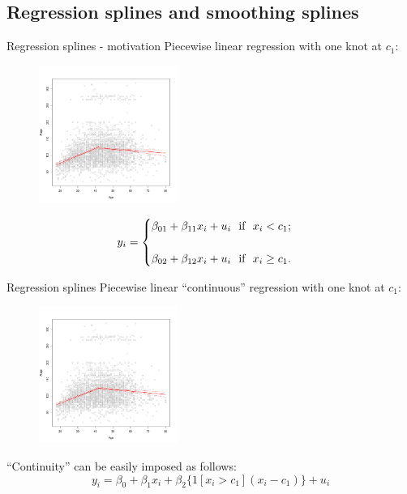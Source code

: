 \documentclass{beamer}
\begin{document}
\subsection{Regression splines and smoothing splines}
\begin{frame}{Regression splines - motivation}
\centering
Piecewise linear regression with one knot at $c_1$:\\
\vspace{-0.2cm}
\begin{figure}
  \centering
  \includegraphics[trim=0cm 0cm 0cm 0cm, clip=true, width=0.4\textwidth]{IMG/ISLR73a.pdf}
\end{figure}
\vspace{-0.2cm}
\begin{equation*}
y_i = 
    \begin{cases}
        \beta_{01} + \beta_{11} x_i + u_i \textnormal{~~if~~} x_i <  c_1 ;& \\ ~ & \\
         \beta_{02} + \beta_{12} x_i + u_i \textnormal{~~if~~} x_i \geq  c_1 .& 
    \end{cases}
\end{equation*}
\end{frame}
\begin{frame}{Regression splines}
\centering
Piecewise linear ``continuous'' regression with one knot at $c_1$:\\
\vspace{-0.2cm}
\begin{figure}
  \centering
  \includegraphics[trim=0cm 0cm 0cm 0cm, clip=true, width=0.4\textwidth]{IMG/ISLR73b.pdf}
\end{figure}
\vspace{-0.5cm}
``Continuity'' can be easily imposed as follows:
$$ y_i = \beta_0 + \beta_1x_i + \beta_2\{1[x_i > c_1](x_i-c_1)\} + u_i$$
\end{frame}
\end{document}
